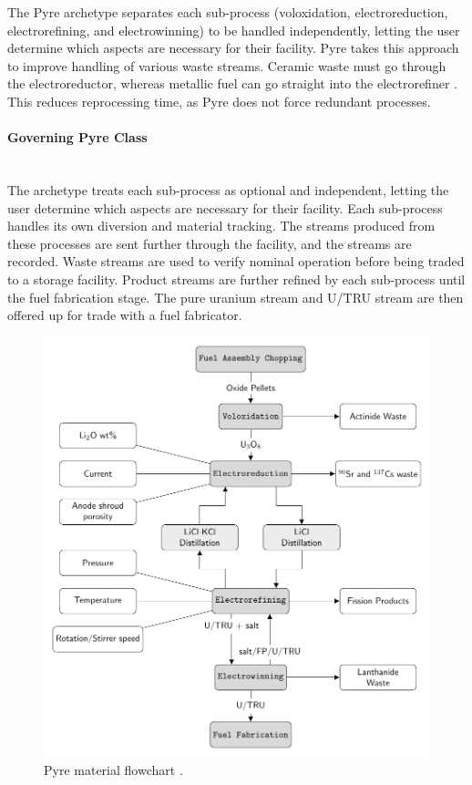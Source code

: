 The Pyre archetype separates each sub-process (voloxidation, electroreduction, electrorefining, and electrowinning) to be handled independently, letting the user determine which aspects are necessary for their facility. Pyre takes this approach to improve handling of various waste streams. Ceramic waste must go through the electroreductor, whereas metallic fuel can go straight into the electrorefiner \cite{michael_f._simpson_developments_2012}. This reduces reprocessing time, as Pyre does not force redundant processes.

\paragraph{Governing Pyre Class} \mbox{}\\
The archetype treats each sub-process as optional and independent, letting the user determine which aspects are necessary for their facility. Each sub-process handles its own diversion and material tracking. The streams produced from these processes are sent further through the facility, and the streams are recorded. Waste streams are
used to verify nominal operation before being traded to a storage facility. Product streams are further refined by each sub-process until the fuel fabrication stage.
The pure uranium stream and U/TRU stream are then offered up for trade with a fuel fabricator.

\FloatBarrier

\begin{figure}[h]
	\centering
	\includegraphics[width=0.9\linewidth]{images/flowchart}
	\caption{Pyre material flowchart \cite{borrelli_approaches_2017}.}
	\label{fig:flowchart}
\end{figure}

